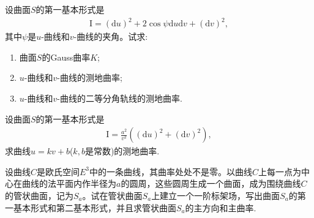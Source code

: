 \documentclass[../../main.tex]{subfiles}%
\begin{document}
\begin{example}
设曲面$S$的第一基本形式是
\begin{align*}
\mathrm{I}=(\mathrm{d}u)^2+2\cos\psi\mathrm{d}u\mathrm{d}v+(\mathrm{d}v)^2,
\end{align*}
其中$\psi$是$u$-曲线和$v$-曲线的夹角。试求:
\begin{enumerate}[(1)]
\item 曲面$S$的Gauss曲率$K$;
\item $u$-曲线和$v$-曲线的测地曲率;
\item $u$-曲线和$v$-曲线的二等分角轨线的测地曲率.
\end{enumerate}
\end{example}

\begin{example}
设曲面$S$的第一基本形式是
\begin{align*}
\mathrm{I}=\frac{a^2}{v^2}\left((\mathrm{d}u)^2+(\mathrm{d}v)^2\right),
\end{align*}
求曲线$u=kv+b$($k,b$是常数)的测地曲率.
\end{example}

\begin{example}
设曲线$C$是欧氏空间$E^3$中的一条曲线，其曲率处处不是零。以曲线$C$上每一点为中心在曲线的法平面内作半径为$a$的圆周，这些圆周生成一个曲面，成为围绕曲线$C$的管状曲面，记为$S_a$。试在管状曲面$S_a$上建立一个一阶标架场，写出曲面$S_a$的第一基本形式和第二基本形式，并且求管状曲面$S_a$的主方向和主曲率.
\end{example}
\end{document}
